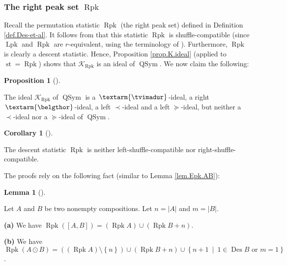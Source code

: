 \documentclass[numbers=enddot,12pt,final,onecolumn,notitlepage]{scrartcl}%
\theoremstyle{definition}
\newtheorem{lem}[theo]{Lemma}
\newenvironment{lemma}[1][]
{\begin{lem}[#1]\begin{leftbar}}
{\end{leftbar}\end{lem}}
\newtheorem{prop}[theo]{Proposition}
\newenvironment{proposition}[1][]
{\begin{prop}[#1]\begin{leftbar}}
{\end{leftbar}\end{prop}}
\newtheorem{coro}[theo]{Corollary}
\newenvironment{corollary}[1][]
{\begin{coro}[#1]\begin{leftbar}}
{\end{leftbar}\end{coro}}
\newenvironment{verlong}{}{}
\newcommand{\tvi}{\left. \textarm{\tvimadur} \right.}
\newcommand{\bel}{\left. \textarm{\belgthor} \right.}
\begin{document}
\begin{verlong}
\subsubsection{The right peak set $\operatorname*{Rpk}$}

Recall the permutation statistic $\operatorname*{Rpk}$ (the right peak set)
defined in Definition \ref{def.Des-et-al}. It follows from \cite[Theorem 4.9
\textbf{(a)} and Theorem 3.5]{part1} that this statistic $\operatorname*{Rpk}$
is shuffle-compatible (since $\operatorname{Lpk}$ and $\operatorname{Rpk}$ are
$r$-equivalent, using the terminology of \cite{part1}). Furthermore,
$\operatorname*{Rpk}$ is clearly a descent statistic. Hence, Proposition
\ref{prop.K.ideal} (applied to $\operatorname*{st}=\operatorname*{Rpk}$) shows
that $\mathcal{K}_{\operatorname*{Rpk}}$ is an ideal of $\operatorname*{QSym}%
$. We now claim the following:

\begin{proposition}
\label{prop.Rpk.dend}The ideal $\mathcal{K}_{\operatorname*{Rpk}}$ of
$\operatorname*{QSym}$ is a $\tvi$-ideal, a right $\bel$-ideal, a left
$\left.  \prec\right.  $-ideal and a left $\left.  \succeq\right.  $-ideal,
but neither a $\left.  \prec\right.  $-ideal nor a $\left.  \succeq\right.
$-ideal of $\operatorname*{QSym}$.
\end{proposition}

\begin{corollary}
\label{cor.dendri.Rpk}The descent statistic $\operatorname*{Rpk}$ is neither
left-shuffle-compatible nor right-shuffle-compatible.
\end{corollary}

The proofs rely on the following fact (similar to Lemma \ref{lem.Epk.AB}):

\begin{lemma}
\label{lem.Rpk.AB}Let $A$ and $B$ be two nonempty compositions. Let
$n=\left\vert A\right\vert $ and $m=\left\vert B\right\vert $.

\textbf{(a)} We have $\operatorname*{Rpk}\left(  \left[  A,B\right]  \right)
=\left(  \operatorname*{Rpk}A\right)  \cup\left(  \operatorname*{Rpk}%
B+n\right)  $.

\textbf{(b)} We have $\operatorname*{Rpk}\left(  A\odot B\right)  =\left(
\left(  \operatorname*{Rpk}A\right)  \setminus\left\{  n\right\}  \right)
\cup\left(  \operatorname*{Rpk}B+n\right)  \cup\left\{  n+1\ \mid
\ 1\in\operatorname*{Des}B\text{ or }m=1\right\}  $.
\end{lemma}


\end{verlong}
\end{document}
